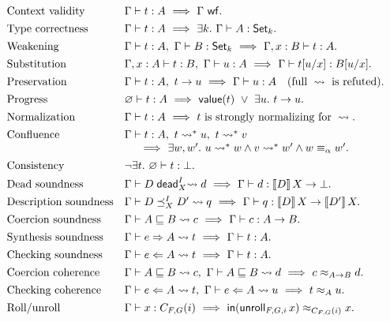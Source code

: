\[
\begin{array}{@{}ll@{}}
 \text{Context validity}&
 \Gamma\vdash t:A\ \Longrightarrow\ \Gamma\ \op{wf}.\\[4pt]
 \text{Type correctness}&
 \Gamma\vdash t:A\ \Longrightarrow\ \exists k.\ \Gamma\vdash A:\Set_k.\\[4pt]
 \text{Weakening}&
 \Gamma\vdash t:A,\ \Gamma\vdash B:\Set_k
 \ \Longrightarrow\ \Gamma,x:B\vdash t:A.\\[4pt]
 \text{Substitution}&
 \Gamma,x:A\vdash t:B,\ \Gamma\vdash u:A
 \ \Longrightarrow\ \Gamma\vdash t[u/x]:B[u/x].\\[4pt]
 \text{Preservation}&
 \Gamma\vdash t:A,\ t\to u
 \ \Longrightarrow\ \Gamma\vdash u:A
 \quad\text{(full }\leadsto\text{ is refuted).}\\[4pt]
 \text{Progress}&
 \varnothing\vdash t:A
 \ \Longrightarrow\ \op{value}(t)\ \lor\ \exists u.\ t\to u.\\[4pt]
 \text{Normalization}&
 \Gamma\vdash t:A\ \Longrightarrow\ t\text{ is strongly normalizing for }\leadsto.\\[4pt]
 \text{Confluence}&
 \Gamma\vdash t:A,\ t\leadsto^*u,\ t\leadsto^*v\\
 &\hspace{6mm}\Longrightarrow\ \exists w,w'.\
   u\leadsto^*w\land v\leadsto^*w'\land w\equiv_\alpha w'.\\[4pt]
 \text{Consistency}&
 \neg\exists t.\ \varnothing\vdash t:\bot.\\[4pt]
 \text{Dead soundness}&
 \dead{D}{X}{d}\ \Longrightarrow\ \Gamma\vdash d:\interp{D}{X}\to\bot.\\[4pt]
 \text{Description soundness}&
 \dsub{D}{D'}{X}{q}\ \Longrightarrow\
 \Gamma\vdash q:\interp{D}{X}\to\interp{D'}{X}.\\[4pt]
 \text{Coercion soundness}&
 \subt{A}{B}{c}\ \Longrightarrow\ \Gamma\vdash c:A\to B.\\[4pt]
 \text{Synthesis soundness}&
 \synth{e}{A}{t}\ \Longrightarrow\ \Gamma\vdash t:A.\\[4pt]
 \text{Checking soundness}&
 \checkt{e}{A}{t}\ \Longrightarrow\ \Gamma\vdash t:A.\\[4pt]
 \text{Coercion coherence}&
 \subt{A}{B}{c},\ \subt{A}{B}{d}
 \ \Longrightarrow\ c\approx_{A\to B}d.\\[4pt]
 \text{Checking coherence}&
 \checkt{e}{A}{t},\ \checkt{e}{A}{u}
 \ \Longrightarrow\ t\approx_A u.\\[4pt]
 \text{Roll/unroll}&
 \Gamma\vdash x:C_{F,G}(i)
 \ \Longrightarrow\ \roll(\unroll_{F,G,i}\,x)\approx_{C_{F,G}(i)}x.
\end{array}
\]
